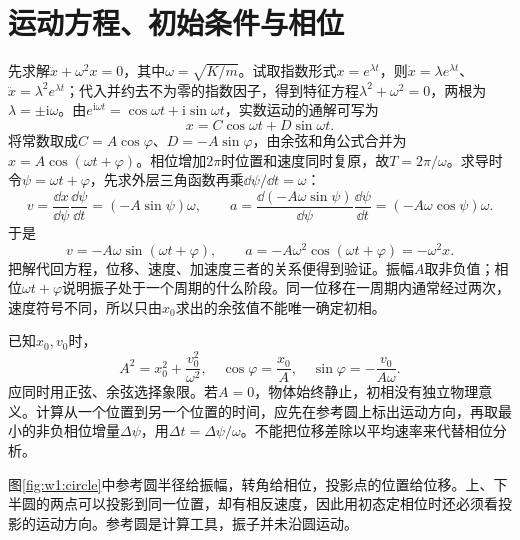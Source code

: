 \section{运动方程、初始条件与相位}
先求解$\ddot x+\omega^2x=0$，其中$\omega=\sqrt{K/m}$。试取指数形式$x=e^{\lambda t}$，则$\dot x=\lambda e^{\lambda t}$、$\ddot x=\lambda^2e^{\lambda t}$；代入并约去不为零的指数因子，得到特征方程$\lambda^2+\omega^2=0$，两根为$\lambda=\pm\mathrm i\omega$。由$e^{\mathrm i\omega t}=\cos\omega t+\mathrm i\sin\omega t$，实数运动的通解可写为
\[
x=C\cos\omega t+D\sin\omega t.
\]
将常数取成$C=A\cos\varphi$、$D=-A\sin\varphi$，由余弦和角公式合并为$x=A\cos(\omega t+\varphi)$。相位增加$2\pi$时位置和速度同时复原，故$T=2\pi/\omega$。求导时令$\psi=\omega t+\varphi$，先求外层三角函数再乘$\dd\psi/\dd t=\omega$：
\[
v=\frac{\dd x}{\dd\psi}\frac{\dd\psi}{\dd t}
=(-A\sin\psi)\omega,\qquad
a=\frac{\dd(-A\omega\sin\psi)}{\dd\psi}\frac{\dd\psi}{\dd t}
=(-A\omega\cos\psi)\omega.
\]
于是
\[
v=-A\omega\sin(\omega t+\varphi),\qquad
a=-A\omega^2\cos(\omega t+\varphi)=-\omega^2x.
\]
把解代回方程，位移、速度、加速度三者的关系便得到验证。振幅$A$取非负值；相位$\omega t+\varphi$说明振子处于一个周期的什么阶段。同一位移在一周期内通常经过两次，速度符号不同，所以只由$x_0$求出的余弦值不能唯一确定初相。

已知$x_0,v_0$时，
\[
A^2=x_0^2+\frac{v_0^2}{\omega^2},\quad
\cos\varphi=\frac{x_0}{A},\quad
\sin\varphi=-\frac{v_0}{A\omega}.
\]
应同时用正弦、余弦选择象限。若$A=0$，物体始终静止，初相没有独立物理意义。计算从一个位置到另一个位置的时间，应先在参考圆上标出运动方向，再取最小的非负相位增量$\Delta\psi$，用$\Delta t=\Delta\psi/\omega$。不能把位移差除以平均速率来代替相位分析。


图\ref{fig:w1:circle}中参考圆半径给振幅，转角给相位，投影点的位置给位移。上、下半圆的两点可以投影到同一位置，却有相反速度，因此用初态定相位时还必须看投影的运动方向。参考圆是计算工具，振子并未沿圆运动。

